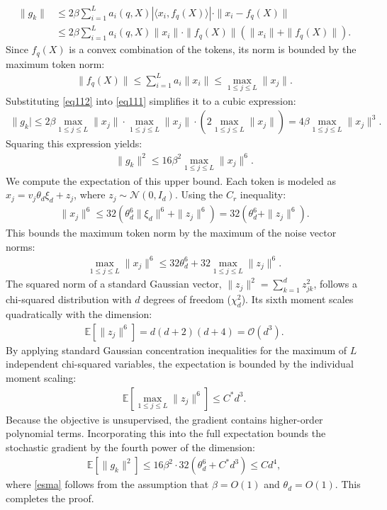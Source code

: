 \documentclass[11pt,a4paper]{article}
\theoremstyle{definition}
\begin{document}
\begin{align}
\|g_k\| &\le 2 \beta \sum_{i=1}^L a_i(q, X) |\langle x_i, f_q(X) \rangle| \cdot \|x_i - f_q(X)\| \nonumber\\
&\le 2 \beta \sum_{i=1}^L a_i(q, X) \|x_i\| \cdot \|f_q(X)\| \left( \|x_i\| + \|f_q(X)\| \right) \label{eq111}. 
\end{align}
Since $f_q(X)$ is a convex combination of the tokens, its norm is bounded by the maximum token norm:
\begin{align}
\|f_q(X)\| \le \sum_{i=1}^L a_i \|x_i\| \le \max_{1 \le j \le L} \|x_j\| \label{eq112}. 
\end{align}
Substituting \eqref{eq112} into \eqref{eq111} simplifies it to a cubic expression:
\begin{align}
\|g_k| \le 2 \beta \max_{1 \le j \le L} \|x_j\| \cdot \max_{1 \le j \le L} \|x_j\| \cdot \left( 2 \max_{1 \le j \le L} \|x_j\| \right) = 4 \beta \max_{1 \le j \le L} \|x_j\|^3.
\end{align}
Squaring this expression yields:
\begin{align}
\|g_k\|^2 \le 16 \beta^2 \max_{1 \le j \le L} \|x_j\|^6.
\end{align}
We compute the expectation of this upper bound. Each token is modeled as $x_j = v_j \theta_d \xi_d + z_j$, where $z_j \sim \mathcal{N}(0, I_d)$. Using the $C_r$ inequality:
\begin{align}
\|x_j\|^6 \le 32 \left( \theta_d^6 \|\xi_d\|^6 + \|z_j\|^6 \right) = 32 \left( \theta_d^6 + \|z_j\|^6 \right).
\end{align}
This bounds the maximum token norm by the maximum of the noise vector norms:
\begin{align}
\max_{1 \le j \le L} \|x_j\|^6 \le 32 \theta_d^6 + 32 \max_{1 \le j \le L} \|z_j\|^6.
\end{align}
The squared norm of a standard Gaussian vector, $\|z_j\|^2 = \sum_{k=1}^d z_{jk}^2$, follows a chi-squared distribution with $d$ degrees of freedom ($\chi^2_d$). Its sixth moment scales quadratically with the dimension:
\begin{align}
\mathbb{E}\left[ \|z_j\|^6 \right] = d(d+2)(d+4) = \mathcal{O}(d^3).
\end{align}
By applying standard Gaussian concentration inequalities for the maximum of $L$ independent chi-squared variables, the expectation is bounded by the individual moment scaling:
\begin{align}
\mathbb{E}\left[ \max_{1 \le j \le L} \|z_j\|^6 \right] \le C^* d^3.
\end{align}
Because the objective is unsupervised, the gradient contains higher-order polynomial terms. Incorporating this into the full expectation bounds the stochastic gradient by the fourth power of the dimension:
\begin{align}
\mathbb{E}\left[ \|g_k\|^2 \right] \le 16 \beta^2 \cdot 32 \left( \theta_d^6 + C^* d^3 \right) \le C d^4 \label{esma},
\end{align} where \eqref{esma} follows from the assumption that $\beta =O(1)$ and  $\theta_d = O(1)$.
This completes the proof.
\end{document}
